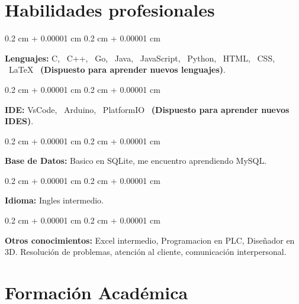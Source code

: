 \documentclass[10pt, letterpaper]{article}
\newenvironment{onecolentry}{
    \begin{adjustwidth}{
        0.2 cm + 0.00001 cm
    }{
        0.2 cm + 0.00001 cm
    }
}{
    \end{adjustwidth}
} %
\begin{document}

            

    \section{Habilidades profesionales}
        \begin{onecolentry}
            \textbf{Lenguajes:} C, \ C++, \ Go, \ Java, \ JavaScript, \ Python, \ HTML, \ CSS, \ LaTeX \ \textbf{(Dispuesto para aprender nuevos
 lenguajes)}.
        \end{onecolentry}

        \vspace{0.2 cm}

        \begin{onecolentry}
            \textbf{IDE:} VsCode, \ Arduino, \ PlatformIO \ \textbf{(Dispuesto para aprender nuevos
 IDES)}.
        \end{onecolentry}

        \vspace{0.2 cm}

        \begin{onecolentry}
            \textbf{Base de Datos:} Basico en SQLite, me encuentro aprendiendo MySQL.
        \end{onecolentry}

        \vspace{0.2 cm}

        \begin{onecolentry}
            \textbf{Idioma:} Ingles intermedio.
        \end{onecolentry}

        \vspace{0.2 cm}

        \begin{onecolentry}
            \textbf{Otros conocimientos:} Excel intermedio, Programacion en PLC, Diseñador en 3D. Resolución de problemas, atención al cliente, comunicación interpersonal.
        \end{onecolentry}

        \vspace{0.2 cm}

    \section{Formación Académica}
\end{document}
